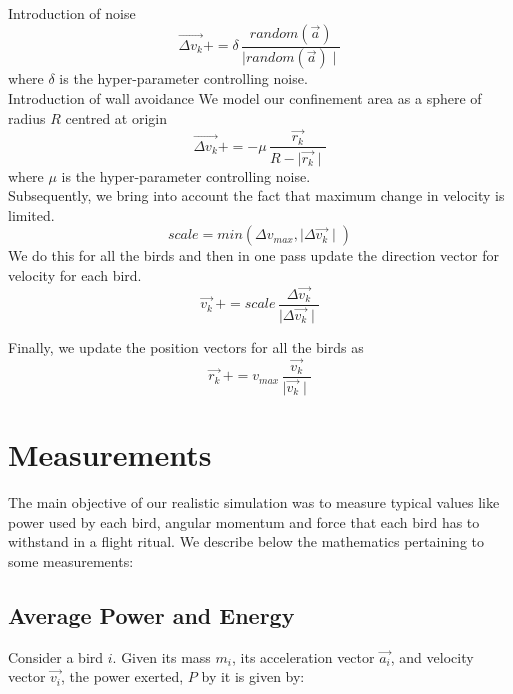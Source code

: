 \documentclass[a4paper,12pt,openany]{book}
\begin{document}
\noindent Introduction of noise 
\begin{equation}
	\vec{\Delta v_k} += \delta \, \frac{random(\vec{a}) }{\mid random(\vec{a}) \mid}
\end{equation}
where $\delta$ is the hyper-parameter controlling noise.\\

\noindent Introduction of wall avoidance
We model our confinement area as a sphere of radius $R$ centred at origin
\begin{equation}
	\vec{\Delta v_k} += -\mu \, \frac{\vec{r_k}}{R - \mid \vec{r_k} \mid}
\end{equation}
where $\mu$ is the hyper-parameter controlling noise.\\

Subsequently, we bring into account the fact that maximum change in velocity is limited.\\
\begin{equation}
	scale = min(\Delta v_{max} , \mid \Delta \vec{v_k} \mid)
\end{equation}
We do this for all the birds and then in one pass update the direction vector for velocity for each bird.
\begin{equation}
	\vec{v_k} \,+=  scale \, \frac{\Delta \vec{v_k}}{\mid \Delta \vec{v_k}\mid}
\end{equation}

\noindent Finally, we update the position vectors for all the birds as
\begin{equation}
	\vec{r_k} \,+=  v_{max} \, \frac{\vec{v_k}}{\mid \vec{v_k}\mid}
\end{equation}

\section{Measurements}
The main objective of our realistic simulation was to measure typical values like power used by each bird, angular momentum and force that each bird has to withstand in a flight ritual. We describe below the mathematics pertaining to some measurements:

\subsection*{Average Power and Energy}
Consider a bird $i$. Given its mass $m_i$, its acceleration vector $\vec{a_i}$, and velocity vector $\vec{v_i}$, the power exerted, $P$ by it is given by:
\end{document}
